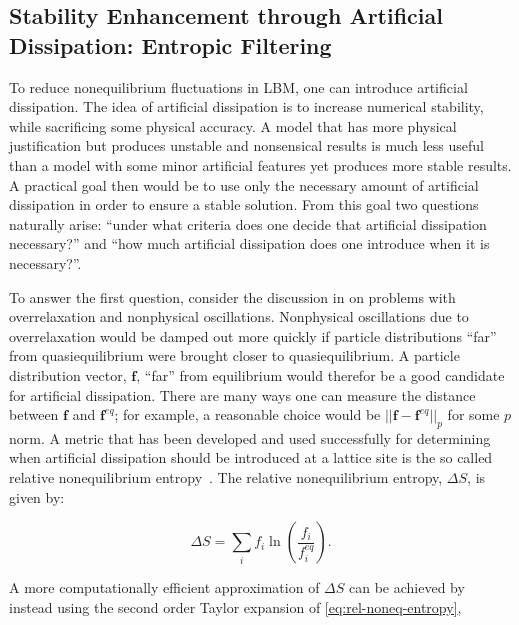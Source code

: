 \documentclass{article}
\begin{document}
\subsection{Stability Enhancement through Artificial Dissipation: Entropic Filtering}

To reduce nonequilibrium fluctuations in LBM, one can introduce artificial dissipation.
The idea of artificial dissipation is to increase numerical stability, while sacrificing some physical accuracy.
A model that has more physical justification but produces unstable and nonsensical results is much less useful than a model with some minor artificial features yet produces more stable results.
A practical goal then would be to use only the necessary amount of artificial dissipation in order to ensure a stable solution.
From this goal two questions naturally arise: ``under what criteria does one decide that artificial dissipation necessary?'' and ``how much artificial dissipation does one introduce when it is necessary?''.

To answer the first question, consider the discussion in  on problems with overrelaxation and nonphysical oscillations.
Nonphysical oscillations due to overrelaxation would be damped out more quickly if particle distributions ``far'' from quasiequilibrium were brought closer to quasiequilibrium.
A particle distribution vector, $\mathbf{f}$, ``far'' from equilibrium would therefor be a good candidate for artificial dissipation.
There are many ways one can measure the distance between $\mathbf{f}$ and $\mathbf{f}^{eq}$; for example, a reasonable choice would be $||\mathbf{f} - \mathbf{f}^{eq}||_p$ for some $p$ norm.
A metric that has been developed and used successfully for determining when artificial dissipation should be introduced at a lattice site is the so called relative nonequilibrium entropy~\cite{gorban2014enhancement,brownlee2006stabilization,brownlee2007stability,brownlee2008nonequilibrium,packwood2009entropy}.
The relative nonequilibrium entropy, $\Delta S$, is given by:

\begin{equation} \label{eq:rel-noneq-entropy}
\Delta S = \sum_i f_i \ln(\frac{f_i}{f^{eq}_i}).
\end{equation}

\noindent A more computationally efficient approximation of $\Delta S$ can be achieved by instead using the second order Taylor expansion of \eqref{eq:rel-noneq-entropy},
\end{document}
